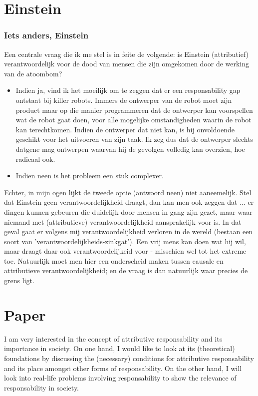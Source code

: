 \documentclass[../main/main.tex]{subfiles}
\begin{document}
\part{Einstein}
\section{Iets anders, Einstein}
Een centrale vraag die ik me stel is in feite de volgende: is Einstein (attributief) verantwoordelijk voor de dood van mensen die zijn omgekomen door de werking van de atoombom?
\begin{itemize}
\item Indien ja, vind ik het moeilijk om te zeggen dat er een responsability gap ontstaat bij killer robots. Immers de ontwerper van de robot moet zijn product maar op die manier programmeren dat de ontwerper kan voorspellen wat de robot gaat doen, voor alle mogelijke omstandigheden waarin de robot kan terechtkomen. Indien de ontwerper dat niet kan, is hij onvoldoende geschikt voor het uitvoeren van zijn taak. Ik zeg dus dat de ontwerper slechts datgene mag ontwerpen waarvan hij de gevolgen volledig kan overzien, hoe radicaal ook.
\item Indien neen is het probleem een stuk complexer.
\end{itemize}


Echter, in mijn ogen lijkt de tweede optie (antwoord neen) niet aaneemelijk. Stel dat Einstein geen verantwoordelijkheid draagt, dan kan men ook zeggen dat ... er dingen kunnen gebeuren die duidelijk door mensen in gang zijn gezet, maar waar niemand met (attributieve) verantwoordelijkheid aansprakelijk voor is. In dat geval gaat er volgens mij verantwoordelijkheid verloren in de wereld (bestaan een soort van 'verantwoordelijkheids-zinkgat'). Een vrij mens kan doen wat hij wil, maar draagt daar ook verantwoordelijkeid voor - misschien wel tot het extreme toe. Natuurlijk moet men hier een onderscheid maken tussen causale en attributieve verantwoordelijkheid; en de vraag is dan natuurlijk waar precies de grens ligt. 

\newpage
\part{Paper}
I am very interested in the concept of attributive responsability and its importance in society. On one hand, I would like to look at its (theoretical) foundations by discussing the (necessary) conditions for attributive responsability and its place amongst other forms of responsability. On the other hand, I will look into real-life problems involving responsability to show the relevance of responsability in society. 
\end{document}
